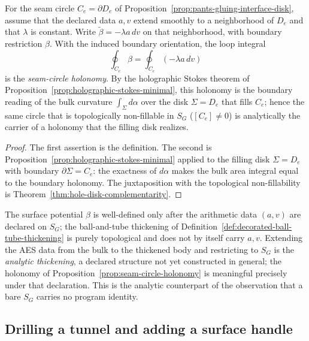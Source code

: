 \begin{proposition}
\label{prop:seam-circle-holonomy}
For the seam circle $C_e=\partial D_e$ of
Proposition~\ref{prop:pants-gluing-interface-disk}, assume that the declared
data $a,v$ extend smoothly to a neighborhood of $D_e$ and that $\lambda$ is
constant.  Write $\widetilde\beta=-\lambda a\,dv$ on that neighborhood, with
boundary restriction $\beta$.  With the induced boundary orientation, the loop integral
\[
  \oint_{C_e}\beta=\oint_{C_e}(-\lambda a\,dv)
\]
is the \emph{seam-circle holonomy}.  By the holographic Stokes theorem of
Proposition~\ref{prop:holographic-stokes-minimal}, this holonomy is the boundary
reading of the bulk curvature $\int_\Sigma d\alpha$ over the disk $\Sigma=D_e$
that fills $C_e$; hence the same circle that is topologically non-fillable in
$S_G$ ($[C_e]\neq0$) is analytically the carrier of a holonomy that the filling
disk realizes.
\end{proposition}

\begin{proof}
The first assertion is the definition.  The second is
Proposition~\ref{prop:holographic-stokes-minimal} applied to the filling disk
$\Sigma=D_e$ with boundary $\partial\Sigma=C_e$: the exactness of $d\alpha$ makes
the bulk area integral equal to the boundary holonomy.  The juxtaposition with
the topological non-fillability is Theorem~\ref{thm:hole-disk-complementarity}.
\end{proof}

\begin{remark}
\label{rem:analytic-thickening-declared}
The surface potential $\beta$ is well-defined only after the arithmetic data
$(a,v)$ are declared on $S_G$; the ball-and-tube thickening of
Definition~\ref{def:decorated-ball-tube-thickening} is purely topological and
does not by itself carry $a,v$.  Extending the AES data from the bulk to the
thickened body and restricting to $S_G$ is the \emph{analytic thickening}, a
declared structure not yet constructed in general; the holonomy of
Proposition~\ref{prop:seam-circle-holonomy} is meaningful precisely under that
declaration.  This is the analytic counterpart of the observation that a bare
$S_G$ carries no program identity.
\end{remark}

\subsection{Drilling a tunnel and adding a surface handle}
\label{subsec:tunnel-handle-surgery}

